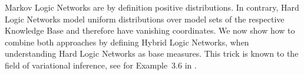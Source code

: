 %
%




\label{sec:hybridNetworks}

Markov Logic Networks are by definition positive distributions.
In contrary, Hard Logic Networks model uniform distributions over model sets of the respective Knowledge Base and therefore have vanishing coordinates.
We now show how to combine both approaches by defining Hybrid Logic Networks, when understanding Hard Logic Networks as base measures.
This trick is known to the field of variational inference, see for Example~3.6 in \cite{wainwright_graphical_2008}.

